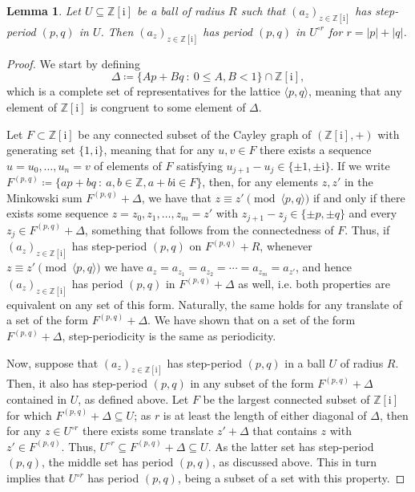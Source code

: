 \documentclass{amsart}
\newcommand{\Z}{\mathbb{Z}}
\newcommand{\ii}{\mathrm{i}}
\newtheorem*{main theorem}{Theorem \ref{thm:main-gaussian}}
\newtheorem{lemma}[theorem]{Lemma}
\theoremstyle{definition}
\begin{document}
\begin{lemma}\label{lem:step-lemma}
    Let $U\subseteq\Z[\ii]$ be a ball of radius $R$ such that $(a_z)_{z\in\Z[\ii]}$ has  step-period $(p,q)$ in $U$. Then $(a_z)_{z\in\Z[\ii]}$ has  period $(p,q)$ in $U^{\circ r}$ for $r=|p|+|q|$.
\end{lemma}

\begin{proof}
    We start by defining 
        \begin{equation}\label{eq:rhombus-fundamental-domain}
            \Delta\coloneq\{Ap+Bq\::\: 0\le A,B<1\}\cap\Z[\ii],
        \end{equation}
   which is a complete set of representatives for the lattice $\langle p,q\rangle$, meaning that any element of $\Z[\ii]$ is congruent to some element of $\Delta$.
    
    Let $F\subset\Z[\ii]$ be any connected subset of the Cayley graph of $(\Z[\ii],+)$ with generating set $\{1,\ii\}$, meaning that for any $u,v\in F$ there exists a sequence $u=u_0,\dotsc,u_n=v$ of elements of $F$ satisfying $u_{j+1}-u_j\in\{\pm 1,\pm\ii\}$. If we write $F^{(p,q)}\coloneqq \{ap+bq\::\:a,b\in\Z,a+b\ii\in F\} $, then, for any elements    $z,z'$ in the Minkowski sum $F^{(p,q)}+\Delta$, we have that $z\equiv z'\pmod{\langle p,q\rangle}$ if and only if there exists some sequence $z=z_0,z_1,\dotsc,z_m=z'$ with $z_{j+1}-z_j\in\{\pm p, \pm q\}$ and every $z_j\in F^{(p,q)}+\Delta$, something that follows from the connectedness of $F$. Thus, if $(a_z)_{z\in\Z[\ii]}$ has step-period $(p,q)$ on $F^{(p,q)}+R$, whenever $z\equiv z'\pmod{\langle p,q\rangle}$ we have $a_z=a_{z_1}=a_{z_2}=\cdots=a_{z_m}=a_{z'}$, and hence $(a_z)_{z\in\Z[\ii]}$ has period $(p,q)$ in $F^{(p,q)}+\Delta$ as well, i.e. both properties are equivalent on any set of this form. Naturally, the same holds for any translate of a set of the form $F^{(p,q)}+\Delta$. We have shown that on a set of the form $F^{(p,q)}+\Delta$, step-periodicity is the same as periodicity.

    Now, suppose that $(a_z)_{z\in\Z[\ii]}$ has step-period $(p,q)$ in a ball $U$ of radius $R$. Then, it also has step-period $(p,q)$ in any subset of the form $F^{(p,q)}+\Delta$ contained in $U$, as defined above. Let $F$ be the largest connected subset of $\Z[\ii]$ for which $F^{(p,q)}+ \Delta\subseteq U$; as $r$ is at least the length of either diagonal of $\Delta$, then for any $z\in U^{\circ r}$ there exists some translate  $z'+\Delta$ that contains $z$ with $z'\in F^{(p,q)}$. Thus, $U^{\circ r}\subseteq F^{(p,q)}+\Delta \subseteq U$. As the latter set has step-period $(p,q)$, the middle set has period $(p,q)$, as discussed above. This in turn implies that $U^{\circ r}$ has period $(p,q)$, being a subset of a set with this property. 
\end{proof}
\end{document}

